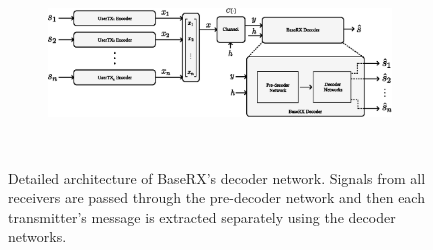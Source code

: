 \begin{figure}[tp!]
	\center
	\begin{subfigure}{0.5\textwidth}
		\includegraphics[width=.98\linewidth]{figs/multi_autoencoder_architecture}
	\end{subfigure}
	\\
	\caption{Detailed architecture of BaseRX's decoder network. Signals from all receivers are passed through the pre-decoder network and then each transmitter's message is extracted separately using the decoder networks.}	
	\label{fig:multi_autoencoder_architecture}
\end{figure}